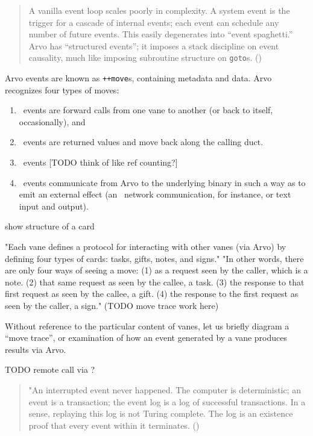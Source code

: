 \begin{quote}
A vanilla event loop scales poorly in complexity.  A system event is the trigger for a cascade of internal events; each event can schedule any number of future events.  This easily degenerates into “event spaghetti.”  Arvo has “structured events”; it imposes a stack discipline on event causality, much like imposing subroutine structure on \texttt{goto}s.  (\cite{Yarvin2017})
\end{quote}

Arvo events are known as \texttt{++move}s, containing metadata and data.  Arvo recognizes four types of moves:

\begin{enumerate}
  \item  \pass~events are forward calls from one vane to another (or back to itself, occasionally), and
  \item  \give~events are returned values and move back along the calling duct.
  \item  \slip~events [TODO think of like ref counting?]
  \item  \unix~events communicate from Arvo to the underlying binary in such a way as to emit an external effect (an \ames~network communication, for instance, or text input and output).
\end{enumerate}

show structure of a card

"Each vane defines a protocol for interacting with other vanes (via Arvo) by defining four types of cards: tasks, gifts, notes, and signs."
"In other words, there are only four ways of seeing a move: (1) as a request seen by the caller, which is a note. (2) that same request as seen by the callee, a task. (3) the response to that first request as seen by the callee, a gift. (4) the response to the first request as seen by the caller, a sign."
(TODO move trace work here)

Without reference to the particular content of vanes, let us briefly diagram a “move trace”, or examination of how an event generated by a vane produces results via Arvo.

TODO remote call via \ames?

\begin{quote}
"An interrupted event never happened.  The computer is deterministic; an event is a transaction; the event log is a log of successful transactions. In a sense, replaying this log is not Turing complete. The log is an existence proof that every event within it terminates.  (\cite{Yarvin2017})
\end{quote}

